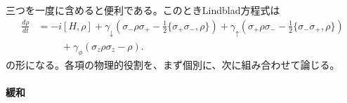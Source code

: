 \documentclass[a4paper,11pt,oneside]{article}
\theoremstyle{definition}
\numberwithin{equation}{section}
\begin{document}
三つを一度に含めると便利である。このときLindblad方程式は
\begin{align}\label{qubitLindblad}
\frac{d\rho}{dt}
&=
-i[H,\rho]
+\gamma_\downarrow
\left(
\sigma_- \rho \sigma_+
-\frac12\{\sigma_+\sigma_-,\rho\}
\right)
+\gamma_\uparrow
\left(
\sigma_+ \rho \sigma_-
-\frac12\{\sigma_-\sigma_+,\rho\}
\right)
\nonumber\\
&\hspace{1cm}
+\gamma_\phi
\left(
\sigma_z \rho \sigma_z
-\rho
\right) .
\end{align}
の形になる。各項の物理的役割を、まず個別に、次に組み合わせて論じる。



\paragraph{緩和}
\end{document}
